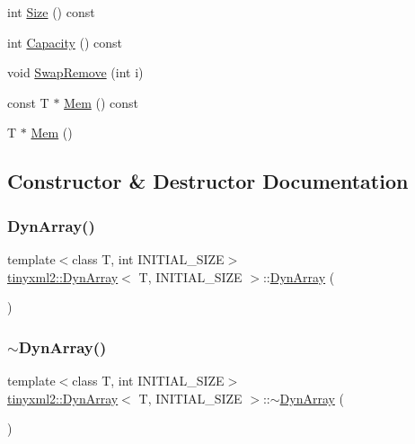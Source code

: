 \begin{DoxyCompactItemize}
int \mbox{\hyperlink{classtinyxml2_1_1_dyn_array_a67614d80847eb92cab330f1a5849a9a2}{Size}} () const
\item 
int \mbox{\hyperlink{classtinyxml2_1_1_dyn_array_a8e101fdf5b4248ac119d7dca6d0f5421}{Capacity}} () const
\item 
void \mbox{\hyperlink{classtinyxml2_1_1_dyn_array_aa72c644f8b5e9ec5dab5b66c88f5665f}{Swap\+Remove}} (int i)
\item 
const T $\ast$ \mbox{\hyperlink{classtinyxml2_1_1_dyn_array_a60b33e61cf10b3fd900ee46692dc0fe9}{Mem}} () const
\item 
T $\ast$ \mbox{\hyperlink{classtinyxml2_1_1_dyn_array_a2f0842cd666e2ad951f1a8bd6561fa40}{Mem}} ()
\end{DoxyCompactItemize}


\subsection{Constructor \& Destructor Documentation}
\mbox{\label{classtinyxml2_1_1_dyn_array_aaad72f384e761c70a4519183eb8fea17}} 
\subsubsection{\texorpdfstring{Dyn\+Array()}{DynArray()}}
{\footnotesize\ttfamily template$<$class T, int I\+N\+I\+T\+I\+A\+L\+\_\+\+S\+I\+ZE$>$ \\
\mbox{\hyperlink{classtinyxml2_1_1_dyn_array}{tinyxml2\+::\+Dyn\+Array}}$<$ T, I\+N\+I\+T\+I\+A\+L\+\_\+\+S\+I\+ZE $>$\+::\mbox{\hyperlink{classtinyxml2_1_1_dyn_array}{Dyn\+Array}} (\begin{DoxyParamCaption}{ }\end{DoxyParamCaption})\hspace{0.3cm}{\ttfamily [inline]}}

\mbox{\label{classtinyxml2_1_1_dyn_array_a4a6aefdca7fe0d3f4068e31870a5adee}} 
\subsubsection{\texorpdfstring{$\sim$\+Dyn\+Array()}{~DynArray()}}
{\footnotesize\ttfamily template$<$class T, int I\+N\+I\+T\+I\+A\+L\+\_\+\+S\+I\+ZE$>$ \\
\mbox{\hyperlink{classtinyxml2_1_1_dyn_array}{tinyxml2\+::\+Dyn\+Array}}$<$ T, I\+N\+I\+T\+I\+A\+L\+\_\+\+S\+I\+ZE $>$\+::$\sim$\mbox{\hyperlink{classtinyxml2_1_1_dyn_array}{Dyn\+Array}} (\begin{DoxyParamCaption}{ }\end{DoxyParamCaption})\hspace{0.3cm}{\ttfamily [inline]}}



